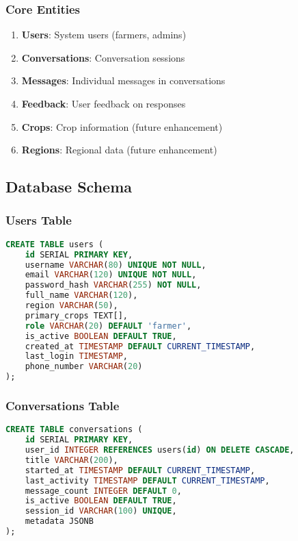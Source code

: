 \documentclass[12pt,a4paper]{article}
\begin{document}
\subsubsection{Core Entities}

\begin{enumerate}[leftmargin=*]
    \item \textbf{Users}: System users (farmers, admins)
    \item \textbf{Conversations}: Conversation sessions
    \item \textbf{Messages}: Individual messages in conversations
    \item \textbf{Feedback}: User feedback on responses
    \item \textbf{Crops}: Crop information (future enhancement)
    \item \textbf{Regions}: Regional data (future enhancement)
\end{enumerate}

\subsection{Database Schema}

\subsubsection{Users Table}

\begin{lstlisting}[language=SQL, caption=Users Table Schema]
CREATE TABLE users (
    id SERIAL PRIMARY KEY,
    username VARCHAR(80) UNIQUE NOT NULL,
    email VARCHAR(120) UNIQUE NOT NULL,
    password_hash VARCHAR(255) NOT NULL,
    full_name VARCHAR(120),
    region VARCHAR(50),
    primary_crops TEXT[],
    role VARCHAR(20) DEFAULT 'farmer',
    is_active BOOLEAN DEFAULT TRUE,
    created_at TIMESTAMP DEFAULT CURRENT_TIMESTAMP,
    last_login TIMESTAMP,
    phone_number VARCHAR(20)
);
\end{lstlisting}

\subsubsection{Conversations Table}

\begin{lstlisting}[language=SQL, caption=Conversations Table Schema]
CREATE TABLE conversations (
    id SERIAL PRIMARY KEY,
    user_id INTEGER REFERENCES users(id) ON DELETE CASCADE,
    title VARCHAR(200),
    started_at TIMESTAMP DEFAULT CURRENT_TIMESTAMP,
    last_activity TIMESTAMP DEFAULT CURRENT_TIMESTAMP,
    message_count INTEGER DEFAULT 0,
    is_active BOOLEAN DEFAULT TRUE,
    session_id VARCHAR(100) UNIQUE,
    metadata JSONB
);
\end{lstlisting}
\end{document}
